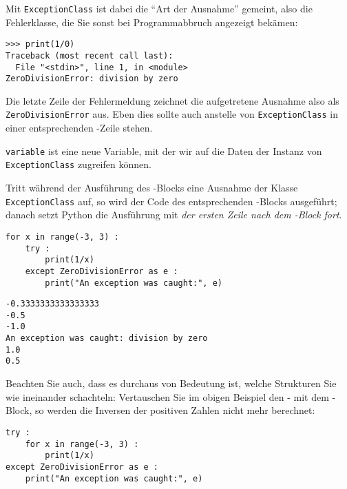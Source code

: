 Mit \texttt{ExceptionClass} ist dabei die \enquote{Art der Ausnahme} gemeint, also die Fehlerklasse, die Sie sonst bei Programmabbruch angezeigt bekämen:

\begin{cmdbox}
\begin{verbatim}
>>> print(1/0)
Traceback (most recent call last):
  File "<stdin>", line 1, in <module>
ZeroDivisionError: division by zero
\end{verbatim}
\end{cmdbox}

Die letzte Zeile der Fehlermeldung zeichnet die aufgetretene Ausnahme also als \texttt{ZeroDivisionError} aus. Eben dies sollte auch anstelle von \texttt{ExceptionClass} in einer entsprechenden -Zeile stehen.

\texttt{variable} ist eine neue Variable, mit der wir auf die Daten der Instanz von \texttt{ExceptionClass} zugreifen können.

Tritt während der Ausführung des -Blocks eine Ausnahme der Klasse \texttt{ExceptionClass} auf, so wird der Code des entsprechenden -Blocks ausgeführt; danach setzt Python die Ausführung mit \emph{der ersten Zeile nach dem -Block fort}.

\begin{codebox}
\begin{verbatim}
for x in range(-3, 3) :
    try :
        print(1/x)
    except ZeroDivisionError as e :
        print("An exception was caught:", e)
\end{verbatim}
\end{codebox}

\begin{cmdbox}
\begin{verbatim}
-0.3333333333333333
-0.5
-1.0
An exception was caught: division by zero
1.0
0.5
\end{verbatim}
\end{cmdbox}

Beachten Sie auch, dass es durchaus von Bedeutung ist, welche Strukturen Sie wie ineinander schachteln: Vertauschen Sie im obigen Beispiel den - mit dem -Block, so werden die Inversen der positiven Zahlen nicht mehr berechnet:

\begin{codebox}
\begin{verbatim}
try :
    for x in range(-3, 3) :
        print(1/x)
except ZeroDivisionError as e :
    print("An exception was caught:", e)
\end{verbatim}
\end{codebox}

